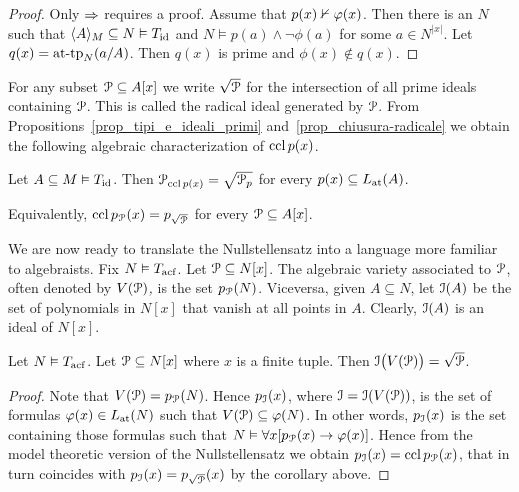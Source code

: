 \begin{proof}
  Only $\IMP$ requires a proof.
  Assume that $p(x)\notproves\phi(x)$.
  Then there is an $N$ such that $\<A\>_M\subseteq N\models T_{\rm id}$ and $N\models p(a)\wedge\neg\phi(a)$ for some $a\in N^{|x|}$.
  Let $q(x)=\attp_N(a/A)$.
  Then $q(x)$ is prime and $\phi(x)\notin q(x)$.
\end{proof}

For any subset $\P\subseteq A[x]$ we write \emph{$\sqrt{\P}$\/} for the intersection of all prime ideals containing $\P$.
This is called the radical ideal generated by $\P$.
From Propositions~\ref{prop_tipi_e_ideali_primi} and~\ref{prop_chiusura-radicale} we obtain the following algebraic characterization of $\ccl\,p(x)$.

\begin{corollary}\label{corol_chiusura_radicale}
  Let $A\subseteq M\models T_{\rm id}$.
  Then $\P_{\ccl\,p(x)}=\sqrt{\P_p}$ for every $p(x)\subseteq\atL(A)$.

  Equivalently, $\ccl\,p_\P(x)=p_{\sqrt{\P}}$ for every $\P\subseteq A[x]$.
\end{corollary}

We are now ready to translate the Nullstellensatz into a language more familiar to algebraists.
Fix $N\models T_{\rm acf}$.
Let $\P\subseteq N[x]$.
The algebraic variety associated to $\P$, often denoted by \emph{$V(\P)$,} is the set $p_\P(N)$.
Viceversa, given $A\subseteq N$, let \emph{$\I(A)$\/} be the set of polynomials in $N[x]$ that vanish at all points in $A$.
Clearly, $\I(A)$ is an ideal of $N[x]$.

\begin{void}\label{thm_Nullstellensatz2}
  Let $N\models T_{\rm acf}$. 
  Let $\P\subseteq N[x]$ where $x$ is a finite tuple.
  Then $\I\big(V(\P)\big)=\sqrt{\P}$.
\end{void}

\begin{proof}
  Note that $V(\P)=p_\P(N)$.
  Hence $p_{\I}(x)$, where $\I=\I(V(\P))$, is the set of formulas $\phi(x)\in\atL(N)$ such that $V(\P)\subseteq\phi(N)$.
  In other words, $p_{\I}(x)$ is the set containing those formulas such that $N\models\A x[p_\P(x)\imp\phi(x)]$.
  Hence from the model theoretic version of the Nullstellensatz we obtain $p_{\I}(x)=\ccl\,p_\P(x)$, that in turn coincides with $p_{\I}(x)=p_{\sqrt{\P}}(x)$ by the corollary above.
\end{proof}

